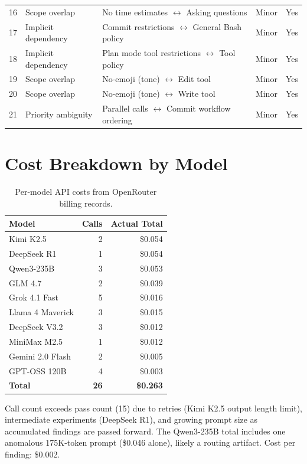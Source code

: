 \documentclass[11pt,a4paper]{article}
\begin{document}
\begin{table}[H]
\begin{tabular}{@{}rlllc@{}}
16 & Scope overlap & No time estimates $\leftrightarrow$ Asking questions & Minor & Yes \\
17 & Implicit dependency & Commit restrictions $\leftrightarrow$ General Bash policy & Minor & Yes \\
18 & Implicit dependency & Plan mode tool restrictions $\leftrightarrow$ Tool policy & Minor & Yes \\
19 & Scope overlap & No-emoji (tone) $\leftrightarrow$ Edit tool & Minor & Yes \\
20 & Scope overlap & No-emoji (tone) $\leftrightarrow$ Write tool & Minor & Yes \\
21 & Priority ambiguity & Parallel calls $\leftrightarrow$ Commit workflow ordering & Minor & Yes \\
\bottomrule
\end{tabular}
\end{table}


\section{Cost Breakdown by Model}
\label{app:cost}

\begin{table}[H]
\centering
\caption{Per-model API costs from OpenRouter billing records.}
\label{tab:cost-model}
\begin{tabular}{@{}lrr@{}}
\toprule
Model & Calls & Actual Total \\
\midrule
Kimi K2.5 & 2 & \$0.054 \\
DeepSeek R1 & 1 & \$0.054 \\
Qwen3-235B & 3 & \$0.053 \\
GLM 4.7 & 2 & \$0.039 \\
Grok 4.1 Fast & 5 & \$0.016 \\
Llama 4 Maverick & 3 & \$0.015 \\
DeepSeek V3.2 & 3 & \$0.012 \\
MiniMax M2.5 & 1 & \$0.012 \\
Gemini 2.0 Flash & 2 & \$0.005 \\
GPT-OSS 120B & 4 & \$0.003 \\
\midrule
\textbf{Total} & \textbf{26} & \textbf{\$0.263} \\
\bottomrule
\end{tabular}
\end{table}

Call count exceeds pass count (15) due to retries (Kimi K2.5 output
length limit), intermediate experiments (DeepSeek R1), and growing
prompt size as accumulated findings are passed forward. The Qwen3-235B
total includes one anomalous 175K-token prompt (\$0.046 alone), likely
a routing artifact. Cost per finding: \$0.002.
\end{document}
